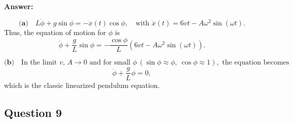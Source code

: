 \documentclass{article}
\begin{document}



\textbf{Answer:}

\[
\textbf{(a)}\quad L\ddot\phi + g\sin\phi = -\ddot x(t)\cos\phi,\quad \text{with } \ddot x(t) = 6vt - A\omega^2\sin(\omega t).
\]
Thus, the equation of motion for \(\phi\) is
\[
\ddot\phi + \frac{g}{L}\sin\phi = -\frac{\cos\phi}{L}\left(6vt - A\omega^2\sin(\omega t)\right).
\]

\vspace{0.5em}
\[
\textbf{(b)}\quad \text{In the limit } v,\,A\to0 \text{ and for small } \phi \, (\sin\phi\approx\phi,\ \cos\phi\approx 1), \text{ the equation becomes}
\]
\[
\ddot\phi + \frac{g}{L}\phi = 0,
\]
which is the classic linearized pendulum equation.



\subsection{Question 9}
\end{document}
